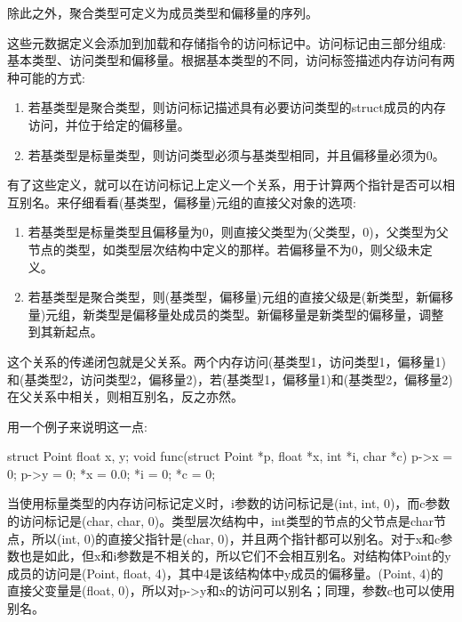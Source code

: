 除此之外，聚合类型可定义为成员类型和偏移量的序列。

这些元数据定义会添加到加载和存储指令的访问标记中。访问标记由三部分组成:基本类型、访问类型和偏移量。根据基本类型的不同，访问标签描述内存访问有两种可能的方式:

\begin{enumerate}
\item
若基类型是聚合类型，则访问标记描述具有必要访问类型的struct成员的内存访问，并位于给定的偏移量。

\item
若基类型是标量类型，则访问类型必须与基类型相同，并且偏移量必须为0。
\end{enumerate}

有了这些定义，就可以在访问标记上定义一个关系，用于计算两个指针是否可以相互别名。来仔细看看(基类型，偏移量)元组的直接父对象的选项:

\begin{enumerate}
\item
若基类型是标量类型且偏移量为0，则直接父类型为(父类型，0)，父类型为父节点的类型，如类型层次结构中定义的那样。若偏移量不为0，则父级未定义。

\item
若基类型是聚合类型，则(基类型，偏移量)元组的直接父级是(新类型，新偏移量)元组，新类型是偏移量处成员的类型。新偏移量是新类型的偏移量，调整到其新起点。
\end{enumerate}

这个关系的传递闭包就是父关系。两个内存访问(基类型1，访问类型1，偏移量1)和(基类型2，访问类型2，偏移量2)，若(基类型1，偏移量1)和(基类型2，偏移量2)在父关系中相关，则相互别名，反之亦然。

用一个例子来说明这一点:

\begin{cpp}
struct Point { float x, y; }
void func(struct Point *p, float *x, int *i, char *c) {
    p->x = 0; p->y = 0; *x = 0.0; *i = 0; *c = 0;
}
\end{cpp}

当使用标量类型的内存访问标记定义时，i参数的访问标记是(int, int, 0)，而c参数的访问标记是(char, char, 0)。类型层次结构中，int类型的节点的父节点是char节点，所以(int, 0)的直接父指针是(char, 0)，并且两个指针都可以别名。对于x和c参数也是如此，但x和i参数是不相关的，所以它们不会相互别名。对结构体Point的y成员的访问是(Point, float, 4)，其中4是该结构体中y成员的偏移量。(Point, 4)的直接父变量是(float, 0)，所以对p->y和x的访问可以别名；同理，参数c也可以使用别名。


